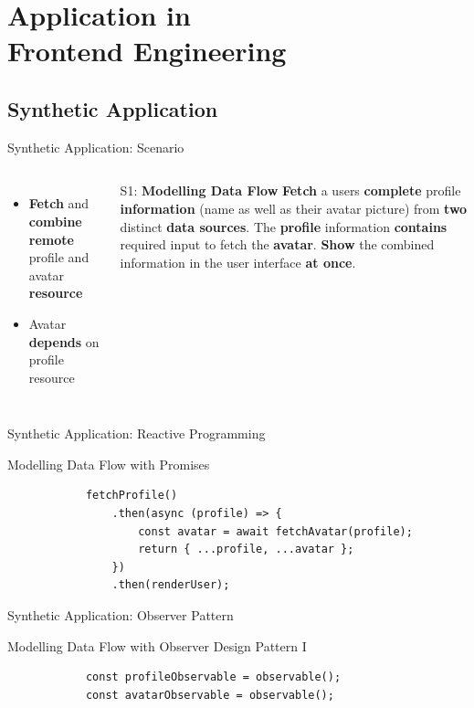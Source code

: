 \documentclass{beamer}
\begin{document}
\section*{Application in\texorpdfstring{\\}{ }Frontend Engineering}

\subsection*{Synthetic Application}
\begin{frame}{Synthetic Application: Scenario}
	\begin{columns}
			\begin{itemize}
				\item \textbf{Fetch} and \textbf{combine remote} profile and avatar \textbf{resource}\bigskip
				\item Avatar \textbf{depends} on profile resource\bigskip
			\end{itemize}

			\begin{block}{S1: \textbf{Modelling Data Flow}}
				\textbf{Fetch} a users \textbf{complete} profile \textbf{information} (name as well as their avatar picture) from \textbf{two} distinct \textbf{data sources}. The \textbf{profile} information \textbf{contains} required input to fetch the \textbf{avatar}. \textbf{Show} the combined information in the user interface \textbf{at once}.
			\end{block}
	\end{columns}
\end{frame}

\begin{frame}[fragile=singleslide]{Synthetic Application: Reactive Programming}
	\begin{block}{Modelling Data Flow with Promises}
		\begin{verbatim}
			fetchProfile()
				.then(async (profile) => {
					const avatar = await fetchAvatar(profile);
					return { ...profile, ...avatar };
				})
				.then(renderUser);
		\end{verbatim}
	\end{block}
\end{frame}

\begin{frame}[fragile=singleslide]{Synthetic Application: Observer Pattern}
	\begin{block}{Modelling Data Flow with Observer Design Pattern \cite{gamma1995design} I}
		\begin{verbatim}
			const profileObservable = observable();
			const avatarObservable = observable();
		\end{verbatim}
	\end{block}
\end{frame}
\end{document}
